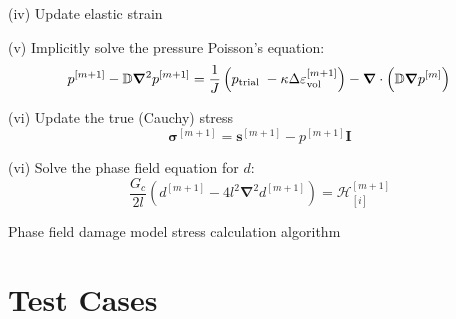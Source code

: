 \documentclass[sn-mathphys,Numbered,draft]{sn-jnl}%
\newcommand{\bb}{\boldsymbol}
\begin{document}
\begin{algorithm}[htbp]
(iv) Update elastic strain

(v) Implicitly solve the pressure Poisson's equation:
\begin{equation}
	p^{[m+1]} - \mathbb{D} \bb{\nabla}^2 p^{[m+1]} =
	\frac{1}{J}\left(p_{\text {trial }} - \kappa \Delta \varepsilon^{[m+1]}_{\text{vol}} \right)
	- \bb{\nabla} \cdot \left( \mathbb{D} \bb{\nabla} p^{[m]} \right) \\
\end{equation}


(vi) Update the true (Cauchy) stress
\begin{equation}
	\boldsymbol{\sigma}^{[m+1]} = \boldsymbol{s}^{[m+1]} -  p^{[m+1]}\textbf{I} \nonumber
\end{equation}


(vi) Solve the phase field equation for $d$:
\begin{equation}
	\frac{G_c}{2l}\left(d^{[m+1]} -4l^2 \bb{\nabla}^2 d^{[m+1]} \right) =
	\mathcal{H}^{[m+1]}_{[i]} %
\end{equation}

\caption{Phase field damage model stress calculation algorithm}
\end{algorithm}




















\section{Test Cases} \label{sec:test_cases}
\end{document}
